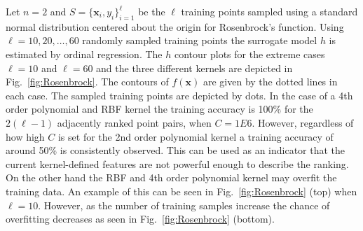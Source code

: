 \documentclass[10pt]{llncs}
\renewcommand{\vec}[1]{{\mbox{\boldmath$#1$}}}
\renewcommand{\vec}[1]{{\mathbf #1}}
\begin{document}
Let $n=2$ and $S=\big\{\vec{x}_i,y_i\big\}_{i=1}^\ell$ be the
$\ell$ training points sampled using a standard normal
distribution centered about the origin for Rosenbrock's
function.  Using $\ell = 10, 20, \ldots, 60$ randomly sampled
training points the surrogate model $h$ is estimated by ordinal
regression. The $h$ contour plots for the extreme cases
$\ell=10$ and $\ell=60$ and the three different kernels are
depicted in Fig.~\ref{fig:Rosenbrock}.  The contours of
$f(\vec{x})$ are given by the dotted lines in each case.  The
sampled training points are depicted by dots. In the case of a
4th order polynomial and RBF kernel the training accuracy is
100\% for the $2(\ell-1)$ adjacently ranked point pairs, when
$C=1E6$.  However, regardless of how high $C$ is set for the 2nd
order polynomial kernel a training accuracy of around 50\% is
consistently observed. This can be used as an indicator that the
current kernel-defined features are not powerful enough to
describe the ranking. On the other hand the RBF and 4th order
polynomial kernel may overfit the training data. An example of
this can be seen in Fig.~\ref{fig:Rosenbrock} (top) when $\ell=10$.
However, as the number of training samples increase the chance
of overfitting decreases as seen in Fig.~\ref{fig:Rosenbrock}
(bottom).
\end{document}

